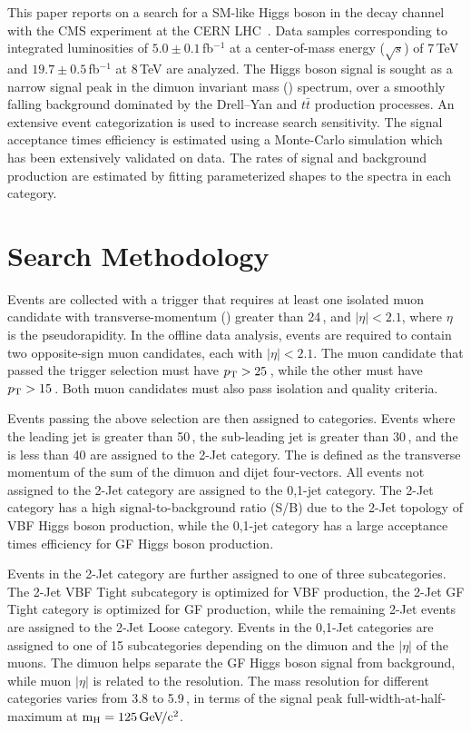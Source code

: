 \documentclass[10pt]{article}
\begin{document}
This paper reports on a search for a SM-like Higgs boson in the \mm{} decay channel 
with the CMS experiment at the CERN LHC~\cite{CMS:2013aga}.  
Data samples corresponding to integrated luminosities of 
$5.0\pm0.1$\,fb$^{-1}$ at a center-of-mass energy ($\sqrt{s}$) of
7\,TeV and $19.7\pm0.5$\,fb$^{-1}$ at 8\,TeV are analyzed.
The Higgs boson signal is sought as a narrow signal peak in the 
dimuon invariant mass (\Mmumu{}) spectrum, over a smoothly falling
background dominated by the Drell--Yan and $t\bar{t}$ production processes.  
An extensive event categorization is used to increase search sensitivity.  
The signal acceptance times efficiency is estimated using a Monte-Carlo
simulation which has been extensively validated on data.
The rates of signal and background production are estimated by fitting 
parameterized shapes to the \Mmumu{} spectra in each category.

\section{Search Methodology}

Events are collected with a trigger that requires at least one
isolated muon candidate with transverse-momentum (\pt) greater than 24\,\GeVc{},
and $|\eta|<2.1$, where $\eta$ is the pseudorapidity.  In the offline
data analysis, events are required to contain two opposite-sign
muon candidates, each with $|\eta|<2.1$.  The muon candidate that passed 
the trigger selection must have $p_{\mathrm{T}}{}>25$\,\GeVc{}, while the other must 
have $p_{\mathrm{T}}>15$\,\GeVc{}. Both muon candidates must also pass isolation and quality 
criteria.

Events passing the above selection are then assigned to categories.  Events
where the leading jet \pt{} is greater than 50\,\GeVc{}, the sub-leading
jet \pt{} is greater than 30\,\GeVc{}, and the \ptmiss{} is less than 40\GeVc{} 
are assigned to the 2-Jet category.  The \ptmiss{} is defined as the transverse
momentum of the sum of the dimuon and dijet four-vectors.
All events not assigned to the 2-Jet category are assigned to the 0,1-jet category.
The 2-Jet category has a high signal-to-background ratio (S/B) due to the 2-Jet
topology of VBF Higgs boson production, while the 0,1-jet category has a large
acceptance times efficiency for GF Higgs boson production.

Events in the 2-Jet category are further assigned to one of three subcategories.  The 2-Jet
VBF Tight subcategory is optimized for VBF production, the 2-Jet GF Tight
category is optimized for GF production, while the remaining 2-Jet events
are assigned to the 2-Jet Loose category.  Events in the 0,1-Jet categories
are assigned to one of 15 subcategories depending on the dimuon \pt{} and the $|\eta|$
of the muons.  The dimuon \pt{} helps separate the GF Higgs boson signal from background,
while muon $|\eta|$ is related to the \Mmumu{} resolution.  The \Mmumu{}
mass resolution for different categories varies from 3.8 to 5.9\,\GeVcc{}, 
in terms of the signal peak full-width-at-half-maximum at $\mathrm{m_H}=125\,\mathrm{Ge\kern -0.1em V\!/c^2}{}$.
\end{document}
